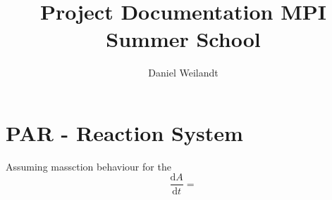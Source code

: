 \documentclass[a4paper]{article}
\title{Project Documentation MPI Summer School}
\author{Daniel Weilandt}
\begin{document}
\maketitle
\section{PAR - Reaction System }
Assuming massction behaviour for the 
\begin{equation}
\frac{\mathrm{d}A}{\mathrm{d}t} = 
\end{equation}
\end{document}
